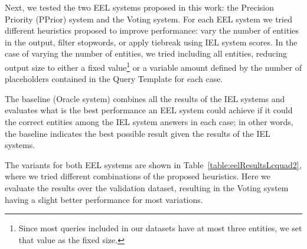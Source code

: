 Next, we tested the two EEL systems proposed in this work: the Precision Priority (PPrior) system 
and the Voting system. For each EEL system we tried different heuristics proposed to improve 
performance: vary the number of entities in the output, filter stopwords, or apply tiebreak using 
IEL system scores. In the case of varying the number of entities, we tried including all entities, 
reducing output size to either a fixed value\footnote{Since most \SPARQL{} queries included in our 
datasets have at most three entities, we set that value as the fixed size. } or a variable amount 
defined by the number of placeholders contained in the Query Template for each case. 

The baseline (Oracle system) combines all the results of the IEL systems and evaluates what is 
the best performance an EEL system could achieve if it could  the correct entities among 
the IEL system answers in each case; in other words, the baseline indicates the best possible 
result given the results of the IEL systems. 

The variants for both EEL systems are shown in Table~\ref{table:eelResultsLcquad2}, where we 
tried different combinations of the proposed heuristics. Here we evaluate the results over the 
\LCQuADtwo{} validation dataset, resulting in the Voting system having a slight better performance 
for most variations. 

